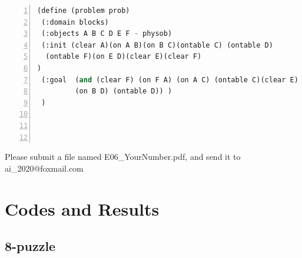 \documentclass[a4paper, 11pt]{article}
\begin{document}
\label{sec:problem-description}

\begin{lstlisting}[title=blocks.pddl,frame=single,language=lisp,numbers=left]
(define (problem prob)
 (:domain blocks)
 (:objects A B C D E F - physob)
 (:init (clear A)(on A B)(on B C)(ontable C) (ontable D)
  (ontable F)(on E D)(clear E)(clear F)
)
 (:goal  (and (clear F) (on F A) (on A C) (ontable C)(clear E) (on E B) 
         (on B D) (ontable D)) )
 )




\end{lstlisting}
Please submit a file named \textsf{E06\_YourNumber.pdf}, and send it to \textsf{ai\_2020@foxmail.com}


\section{Codes and Results}

\subsection{8-puzzle}
\end{document}

